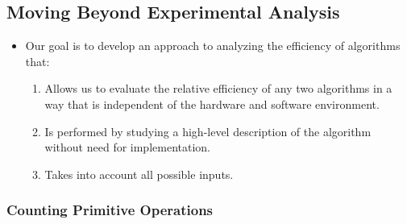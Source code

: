 \documentclass[11pt]{article}
\providecommand{\tightlist}{%
      \setlength{\itemsep}{0pt}\setlength{\parskip}{0pt}}
\begin{document}
    \hypertarget{moving-beyond-experimental-analysis}{%
\subsection{Moving Beyond Experimental
Analysis}\label{moving-beyond-experimental-analysis}}

\begin{itemize}
\tightlist
\item
  Our goal is to develop an approach to analyzing the efficiency of
  algorithms that:

  \begin{enumerate}
  \def\labelenumi{\arabic{enumi}.}
  \tightlist
  \item
    Allows us to evaluate the relative efficiency of any two algorithms
    in a way that is independent of the hardware and software
    environment.
  \item
    Is performed by studying a high-level description of the algorithm
    without need for implementation.
  \item
    Takes into account all possible inputs.
  \end{enumerate}
\end{itemize}

    \hypertarget{counting-primitive-operations}{%
\subsubsection{Counting Primitive
Operations}\label{counting-primitive-operations}}
\end{document}
